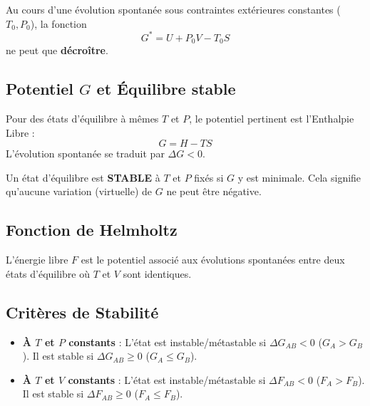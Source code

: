 \documentclass[french]{yLectureNote}
\begin{document}
\begin{proposition}
Au cours d'une évolution spontanée sous contraintes extérieures constantes ($T_0, P_0$), la fonction $$G^* = U + P_0V - T_0S$$ ne peut que \textbf{décroître}.
\end{proposition}

\subsection{Potentiel $G$ et Équilibre stable}

\begin{theorem}
Pour des états d'équilibre à mêmes $T$ et $P$, le potentiel pertinent est l'Enthalpie Libre :
$$G = H - TS$$
L'évolution spontanée se traduit par $\Delta G < 0$.
\end{theorem}

Un état d'équilibre est \textbf{STABLE} à $T$ et $P$ fixés si $G$ y est minimale. Cela signifie qu'aucune variation (virtuelle) de $G$ ne peut être négative.



\subsection{Fonction de Helmholtz}


\begin{proposition}
L'énergie libre $F$ est le potentiel associé aux évolutions spontanées entre deux états d'équilibre où $T$ et $V$ sont identiques.
\end{proposition}




\subsection{Critères de Stabilité}
\begin{itemize}
    \item \textbf{À $T$ et $P$ constants} : L'état est instable/métastable si $\Delta G_{AB} < 0$ ($G_A > G_B$). Il est stable si $\Delta G_{AB} \ge 0$ ($G_A \le G_B$).
    \item \textbf{À $T$ et $V$ constants} : L'état est instable/métastable si $\Delta F_{AB} < 0$ ($F_A > F_B$). Il est stable si $\Delta F_{AB} \ge 0$ ($F_A \le F_B$).
\end{itemize}
\end{document}
